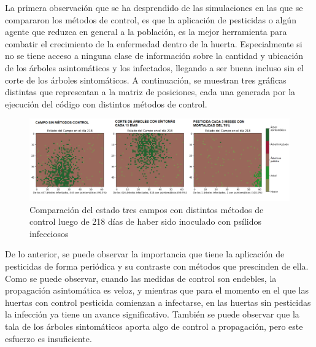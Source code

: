 La primera observación que se ha desprendido de las simulaciones en las que se compararon los métodos de control, es que la aplicación de pesticidas o algún agente que reduzca en general a la población, es la mejor herramienta para combatir el crecimiento de la enfermedad dentro de la huerta. Especialmente si no se tiene acceso a ninguna clase de información sobre la cantidad y ubicación de los árboles asintomáticos y los infectados, llegando a ser buena incluso sin el corte de los árboles sintomáticos. A continuación, se muestran tres gráficas distintas que representan a la matriz de posiciones, cada una generada por la ejecución del código con distintos métodos de control.
\begin{figure}[H]
\centering
\includegraphics[width=1\textwidth,keepaspectratio=true]{images/Imágenes C6/C6-1.png}
\caption{Comparación del estado tres campos con distintos métodos de control luego de 218 días de haber sido inoculado con psílidos infecciosos}
\end{figure}
De lo anterior, se puede observar la importancia que tiene la aplicación de pesticidas de forma periódica y su contraste con métodos que prescinden de ella. Como se puede observar, cuando las medidas de control son endebles, la propagación asintomática es veloz, y mientras que para el momento en el que las huertas con control pesticida comienzan a infectarse, en las huertas sin pesticidas la infección ya tiene un avance significativo. También se puede observar que la tala de los árboles sintomáticos aporta algo de control a propagación, pero este esfuerzo es insuficiente. 


